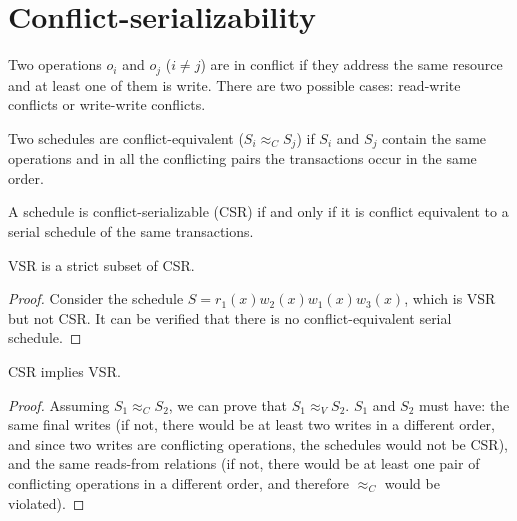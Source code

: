 \section{Conflict-serializability}

\begin{definition}
    Two operations $o_i$ and $o_j$ ($i \neq j$) are in conflict if they address the same resource and at least one of them is write. 
    There are two possible cases: read-write conflicts or write-write conflicts.
\end{definition}
\begin{definition}
    Two schedules are conflict-equivalent ($S_i \approx_C S_j$) if $S_i$ and $S_j$ contain the same operations and in all the conflicting pairs the transactions occur in the same order. 
\end{definition}    
\begin{definition}
    A schedule is conflict-serializable (CSR) if and only if it is conflict equivalent to a serial schedule of the same transactions. 
\end{definition}
\begin{property}
    VSR is a strict subset of CSR. 
\end{property}
\begin{proof}
    Consider the schedule $S = r_1(x) w_2(x) w_1(x) w_3(x)$, which is VSR but not CSR. 
    It can be verified that there is no conflict-equivalent serial schedule.
\end{proof}
\begin{property}
    CSR implies VSR.
\end{property}
\begin{proof}
    Assuming $S_1 \approx_C S_2$, we can prove that $S_1 \approx_V S_2$. 
    $S_1$ and $S_2$ must have: the same final writes (if not, there would be at least two writes in a different order, and since two writes are conflicting operations, the schedules would not be CSR), and the same reads-from relations (if not, there would be at least one pair of conflicting operations in a different order, and therefore $\approx_C$ would be violated).
\end{proof}

